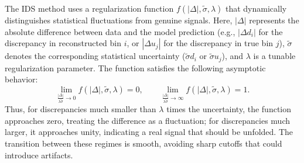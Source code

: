 The IDS method uses a regularization function $f\left(|\Delta|, \tilde{\sigma},
    \lambda\right)$ that dynamically distinguishes statistical fluctuations from
genuine signals. Here, $|\Delta|$ represents the absolute difference between
data and the model prediction (e.g., $|\Delta d_i|$ for the discrepancy in
reconstructed bin $i$, or $|\Delta u_j|$ for the discrepancy in true bin $j$),
$\tilde{\sigma}$ denotes the corresponding statistical uncertainty
($\tilde{\sigma} d_i$ or $\tilde{\sigma} u_j$), and $\lambda$ is a tunable
regularization parameter. The function satisfies the following asymptotic
behavior:
\begin{equation}
    \lim_{\frac{|\Delta|}{\lambda \tilde{\sigma}} \to 0} f(|\Delta|, \tilde{\sigma}, \lambda) = 0, \qquad
    \lim_{\frac{|\Delta|}{\lambda \tilde{\sigma}} \to \infty} f(|\Delta|, \tilde{\sigma}, \lambda) = 1.
    \label{eq:reg_function_limits}
\end{equation}
Thus, for discrepancies much smaller than $\lambda$ times the uncertainty, the function approaches zero, treating the difference as a fluctuation; for discrepancies much larger, it approaches unity, indicating a real signal that should be unfolded. The transition between these regimes is smooth, avoiding sharp cutoffs that could introduce artifacts.

